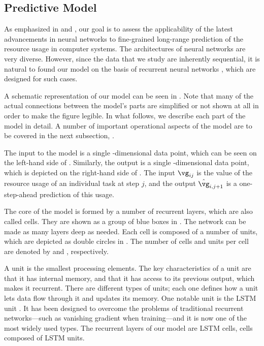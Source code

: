 \subsection{Predictive Model}

As emphasized in  and , our
goal is to assess the applicability of the latest advancements in neural
networks \cite{goodfellow2016} to fine-grained long-range prediction of the
resource usage in computer systems. The architectures of neural networks are
very diverse. However, since the data that we study are inherently sequential,
it is natural to found our model on the basis of recurrent neural networks
\cite{goodfellow2016}, which are designed for such cases.

A schematic representation of our model can be seen in .
Note that many of the actual connections between the model's parts are
simplified or not shown at all in order to make the figure legible. In what
follows, we describe each part of the model in detail. A number of important
operational aspects of the model are to be covered in the next subsection,
.

The input to the model is a single \ng-dimensional data point, which can be seen
on the left-hand side of . Similarly, the output is a single
\ng-dimensional data point, which is depicted on the right-hand side of
. The input $\vg_{ij}$ is the value of the resource usage of
an individual task at step $j$, and the output $\hat{\vg}_{i,j + 1}$ is a
one-step-ahead prediction of this usage.

The core of the model is formed by a number of recurrent layers, which are also
called cells. They are shown as a group of blue boxes in .
The network can be made as many layers deep as needed. Each cell is composed of
a number of units, which are depicted as double circles in .
The number of cells and units per cell are denoted by \nc and \nu, respectively.

A unit is the smallest processing elements. The key characteristics of a unit
are that it has internal memory, and that it has access to its previous output,
which makes it recurrent. There are different types of units; each one defines
how a unit lets data flow through it and updates its memory. One notable unit is
the \ac{LSTM} unit \cite{hochreiter1997}. It has been designed to overcome the
problems of traditional recurrent networks---such as vanishing gradient when
training---and it is now one of the most widely used types. The recurrent layers
of our model are \ac{LSTM} cells, cells composed of \ac{LSTM} units.

